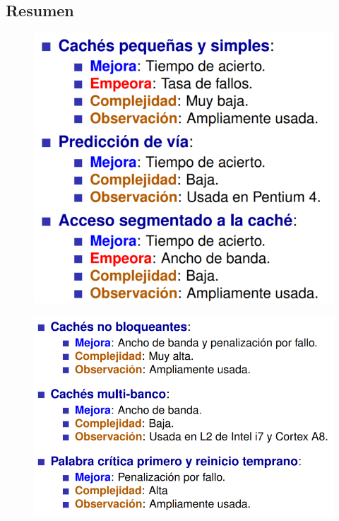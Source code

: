 \documentclass[12pt, twoside, openright]{report} %
\begin{document}
  \subsection{Resumen}
  \begin{figure}[H]
    {\includegraphics[scale=.35]{Untitled 23.png}}
  \end{figure}
  \begin{figure}[H]
    {\includegraphics[scale=.3]{Untitled 24.png}}
  \end{figure} 
\end{document}
